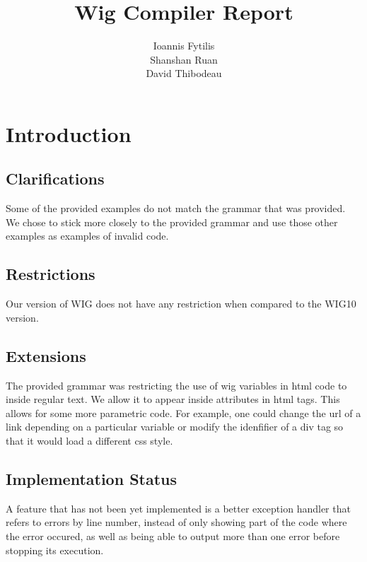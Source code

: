 \documentclass{WigReport}
\title{Wig Compiler Report}
\author{Ioannis Fytilis \\  %
        Shanshan Ruan \\
        David Thibodeau}
\begin{document}
\maketitle
\tableofcontents
\clearpage

%
\section{Introduction}
\subsection{Clarifications}
Some of the provided examples do not match the grammar that was provided. We chose to stick more closely to the provided grammar and use those other examples as examples of invalid code.

\subsection{Restrictions}
Our version of WIG does not have any restriction when compared to the WIG10 version.

\subsection{Extensions}
The provided grammar was restricting the use of wig variables in html code to inside regular text. We allow it to appear inside attributes in html tags. This allows for some more parametric code. For example, one could change the url of a link depending on a particular variable or modify the idenfifier of a div tag so that it would load a different css style.


\subsection{Implementation Status}
A feature that has not been yet implemented is a better exception handler that refers to errors by line number, instead of only showing part of the code where the error occured, as well as being able to output more than one error before stopping its execution.
\end{document}
